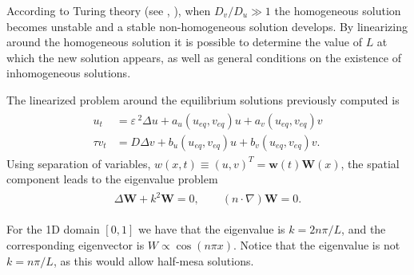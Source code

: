 \documentclass[a4paper,10pt]{article}
\newcommand{\De}{\ensuremath{\Delta}}
\newcommand{\Ep}{\ensuremath{\varepsilon\,}}
\newcommand{\ww}{\ensuremath{\mathbf{w}}}
\newcommand{\WW}{\ensuremath{\mathbf{W}}}
\begin{document}
According to Turing theory (see \cite{turing_chemical_1952}, \cite{murray_mathematical_2003-2}), when $D_v/D_u\gg 1$ the homogeneous solution becomes unstable and a stable non-homogeneous solution develops. By linearizing around the homogeneous solution it is possible to determine the value of $L$ at which the new solution appears, as well as general conditions on the existence of inhomogeneous solutions. 

The linearized problem around the equilibrium solutions previously computed is
% 
\begin{equation}
\label{eqn:linear1}
\begin{split}
\begin{aligned}
	u_t &= \Ep^2\De u + a_u(u_{eq},v_{eq})u + a_v(u_{eq},v_{eq})v \\
	\tau v_t &= D\De v + b_u(u_{eq},v_{eq})u + b_v(u_{eq},v_{eq})v.
\end{aligned}
\end{split}
\end{equation}
%
Using separation of variables, $w(x,t)\equiv(u,v)^T=\ww(t)\WW(x)$, the spatial component leads to the eigenvalue problem
% 
\begin{equation}
\label{eqn:spatial1}
\begin{split}
\begin{aligned}
	\De \WW+k^2\WW=0,\qquad (n\cdot\nabla)\WW=0.
\end{aligned}
\end{split}
\end{equation}

For the 1D domain $[0,1]$ we have that the eigenvalue is $k=2n\pi/L$, and the corresponding eigenvector is $W \propto \cos(n\pi x)$. Notice that the eigenvalue is not $k=n\pi/L$, as this would allow half-mesa solutions.
\end{document}
